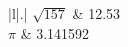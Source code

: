 ﻿\documentclass{jarticle}
\begin{document}
\begin{center}
  \begin{tabular}{|l|.|}
   $\sqrt{157}$ & 12.53    \\
   $\pi$        & 3.141592 \\
  \end{tabular}
\end{center}
\end{document}
